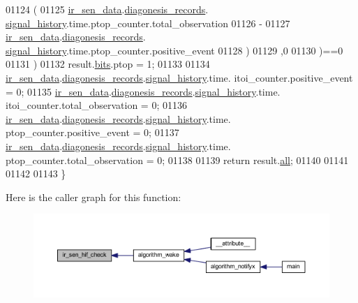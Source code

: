 \begin{DoxyCode}
01124           (
01125            \hyperlink{a00045_a73dfacb46242746440accc76c7ef710d}{ir\_sen\_data}.\hyperlink{a00023_a7ae905b560513ad201e58c2f63375030}{diagonesis\_records}.
      \hyperlink{a00017_affb63906d23cb1cb7787d61eaaedfb60}{signal\_history}.time.ptop\_counter.total\_observation
01126           -
01127            \hyperlink{a00045_a73dfacb46242746440accc76c7ef710d}{ir\_sen\_data}.\hyperlink{a00023_a7ae905b560513ad201e58c2f63375030}{diagonesis\_records}.
      \hyperlink{a00017_affb63906d23cb1cb7787d61eaaedfb60}{signal\_history}.time.ptop\_counter.positive\_event
01128           )
01129          ,0
01130           )==0
01131        )
01132         result.\hyperlink{a00021_a4c757443cba2deaf7051fd53f385a73e}{bits}.ptop = 1;
01133 
01134     \hyperlink{a00045_a73dfacb46242746440accc76c7ef710d}{ir\_sen\_data}.\hyperlink{a00023_a7ae905b560513ad201e58c2f63375030}{diagonesis\_records}.\hyperlink{a00017_affb63906d23cb1cb7787d61eaaedfb60}{signal\_history}.time.
      itoi\_counter.positive\_event      = 0;
01135     \hyperlink{a00045_a73dfacb46242746440accc76c7ef710d}{ir\_sen\_data}.\hyperlink{a00023_a7ae905b560513ad201e58c2f63375030}{diagonesis\_records}.\hyperlink{a00017_affb63906d23cb1cb7787d61eaaedfb60}{signal\_history}.time.
      itoi\_counter.total\_observation   = 0;
01136     \hyperlink{a00045_a73dfacb46242746440accc76c7ef710d}{ir\_sen\_data}.\hyperlink{a00023_a7ae905b560513ad201e58c2f63375030}{diagonesis\_records}.\hyperlink{a00017_affb63906d23cb1cb7787d61eaaedfb60}{signal\_history}.time.
      ptop\_counter.positive\_event      = 0;
01137     \hyperlink{a00045_a73dfacb46242746440accc76c7ef710d}{ir\_sen\_data}.\hyperlink{a00023_a7ae905b560513ad201e58c2f63375030}{diagonesis\_records}.\hyperlink{a00017_affb63906d23cb1cb7787d61eaaedfb60}{signal\_history}.time.
      ptop\_counter.total\_observation   = 0;
01138 
01139     \textcolor{keywordflow}{return} result.\hyperlink{a00021_a2625a533c46821f49caaf4dcc77316b1}{all};
01140 
01141 
01142 
01143 \}
\end{DoxyCode}


Here is the caller graph for this function\+:\nopagebreak
\begin{figure}[H]
\begin{center}
\leavevmode
\includegraphics[width=350pt]{d6/d97/a00045_a86870a0e00601a92277e689447739ce9_icgraph}
\end{center}
\end{figure}


